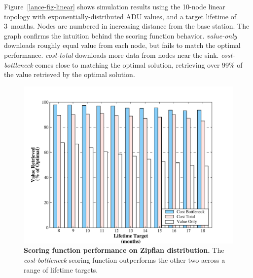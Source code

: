 Figure~\ref{lance-fig-linear} shows simulation results using the 10-node
linear topology with exponentially-distributed ADU values, and a target
lifetime of 3~months. Nodes are numbered in increasing distance from the base
station. The graph confirms the intuition behind the scoring function
behavior. \textit{value-only} downloads roughly equal value from each node,
but fails to match the optimal performance. \textit{cost-total} downloads
more data from nodes near the sink. \textit{cost-bottleneck} comes close to
matching the optimal solution, retrieving over 99\% of the value retrieved by
the optimal solution.

\begin{figure}[t]
\begin{center}
\includegraphics[width=1.0\hsize]{./4-lance/figs/zipfian.pdf}
\end{center}

\caption{\textbf{Scoring function performance on Zipfian distribution.} The
\textit{cost-bottleneck} scoring function outperforms the other two across a
range of lifetime targets.}

\label{lance-fig-zipfian}
\end{figure}

